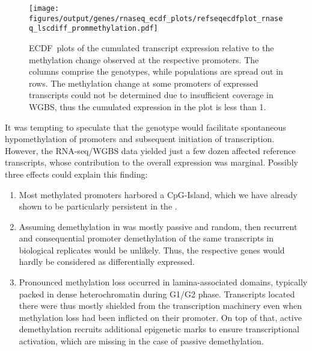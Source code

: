\begin{figure}[!ht]
	\centering
	\texttt{[image: figures/output/genes/rnaseq\_ecdf\_plots/refseqecdfplot\_rnaseq\_lscdiff\_prommethylation.pdf]} 
	\caption{ECDF~plots of the cumulated transcript expression relative to the methylation change observed at the respective promoters. The columns comprise the genotypes, while populations are spread out in rows. The methylation change at some promoters of expressed transcripts could not be determined due to insufficient coverage in WGBS, thus the cumulated expression in the plot is less than \num{1}.}
	\label{fig:refseqecdfplot_rnaseq_lscdiff_prommethylation}
\end{figure}



It was tempting to speculate that the \dnmtchip genotype would facilitate spontaneous hypomethylation of promoters and subsequent initiation of transcription. However, the RNA-seq/WGBS data yielded just a few dozen affected reference transcripts, whose contribution to the overall expression was marginal. Possibly three effects could explain this finding: 

\begin{enumerate}
\item Most methylated promoters harbored a CpG-Island, which we have already shown to be particularly persistent in the \dnmtchip {}. 
\item Assuming demethylation in \dnmtchip was mostly passive and random, then recurrent and consequential promoter demethylation of the same transcripts in biological replicates would be unlikely. Thus, the respective genes would hardly be considered as differentially expressed. 
\item Pronounced methylation loss occurred in lamina-associated domains, typically packed in dense heterochromatin during G1/G2 phase. Transcripts located there were thus mostly shielded from the transcription machinery even when methylation loss had been inflicted on their promoter. On top of that, active demethylation recruits additional epigenetic marks to ensure transcriptional activation, which are missing in the case of passive demethylation\cite{Chen2013,Fujiki2011,Deplus2013}. 
\end{enumerate}

